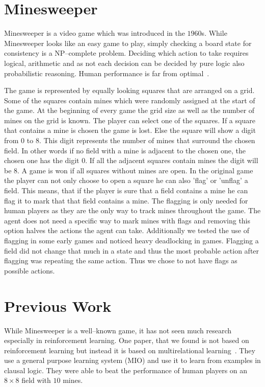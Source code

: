\section{Minesweeper}
Minesweeper is a video game which was introduced in the $1960$s. 
While Minesweeper looks like an easy game to play, simply checking a board state for consistency is a NP--complete problem.
Deciding which action to take requires logical, arithmetic and as not each decision can be decided by pure logic also probabilistic reasoning.
Human performance is far from optimal~\cite{castillo2003learning}.

The game is represented by equally looking squares that are arranged on a grid. 
Some of the squares contain mines which were randomly assigned at the start of the game. 
At the beginning of every game the grid size as well as the number of mines on the grid is known.
The player can select one of the squares. 
If a square that contains a mine is chosen the game is lost.
Else the square will show a digit from $0$ to $8$.
This digit represents the number of mines that surround the chosen field.
In other words if no field with a mine is adjacent to the chosen one, the chosen one has the digit $0$. 
If all the adjacent squares contain mines the digit will be $8$.
A game is won if all squares without mines are open.
In the original game the player can not only choose to open a square he can also 'flag' or 'unflag' a field.
This means, that if the player is sure that a field contains a mine he can flag it to mark that that field contains a mine.
The flagging is only needed for human players as they are the only way to track mines throughout the game.
The agent does not need a specific way to mark mines with flags and removing this option halves the actions the agent can take.
Additionally we tested the use of flagging in some early games and noticed heavy deadlocking in games.
Flagging a field did not change that much in a state and thus the most probable action after flagging was repeating the same action.
Thus we chose to not have flags as possible actions.

\section{Previous Work}
While Minesweeper is a well--known game, it has not seen much research especially in reinforcement learning.
One paper, that we found is not based on reinforcement learning but instead it is based on multirelational learning~\cite{castillo2003learning}.
They use a general purpose learning system (MIO) and use it to learn from examples in clausal logic.
They were able to beat the performance of human players on an $8\times8$ field with $10$ mines.